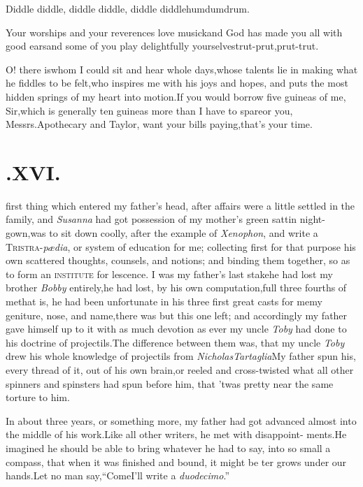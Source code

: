 \documentclass{article}
\begin{document}
Diddle diddle, diddle diddle, diddle\break
diddle\tsk hum\tsk dum\tsk drum.


\tsk Your worships and your reverences love musick\tsk and
God has made you all with good ears\tsk and some of you play
delightfully yourselves\tsk trut-prut,\tsk prut-trut.

O! there is\tsk whom I could sit and hear whole
days,\tsk whose talents lie in making what he fiddles to be
felt,\tsk who inspires me with his joys and hopes, and puts the
most hidden springs of my heart into\break
motion.\tsh If you would
borrow five guineas of me, Sir,\tsk which is generally ten
guineas more than I have to spare\tsk or you, Messrs.\@ Apothecary
and Taylor, want your bills paying,\tsk that’s your\break
time.

\section{.\enspace  XVI.}

\setlength{\baselineskip}{12.7826pt}%

 first thing which entered my\break
father’s head, after affairs were a\break
little settled in the family, and \textit{Susanna} had got possession of my mother’s
green sattin night-gown,\tsk was to sit down coolly, after the
example of \textit{Xenophon}, and write a
\textsc{Tristra}-\textit{pædia}, or system of education
for me; collecting first for that purpose his own scattered
thoughts, counsels, and notions; and binding them together, so as
to form an \textsc{institute} for  lescence. I was my father’s last
stake\tsk he had lost my brother \textit{Bobby} entirely,\tsk he
had lost, by his own computation,\break full three fourths of
me\tsk that is, he had been unfortunate in his three first great
casts for me\tsk my geniture, nose, and name,\tsk there was but
this one left; and accordingly my father gave himself up to it with
as much devotion as ever my uncle \textit{Toby} had done to his
doctrine of projectils.\tsk The difference between them was, that my uncle \textit{Toby} drew his whole
know\-ledge of projectils from \textit{Nicholas\break Tartaglia}\tsk My
father spun his, every thread of it, out of his own brain,\tsk or
reeled and cross-twisted what all other spinners and spinsters had
spun before him, that ’twas pretty near the same torture to
him.

\enlargethispage\baselineskip
In about three years, or something more, my father had got
advanced almost into the middle of his work.\tsk Like all other
writers, he met with disappoint- 
ments.\tsk He imagined he should be\break
able to bring whatever he had to say,\break
into so small a compass, that when it\break
was finished and bound, it might be\break
{}
ter grows under our hands.\tsk Let no man say,\tsk “Come\tsk I’ll write a \textit{duodecimo}.”
\end{document}
